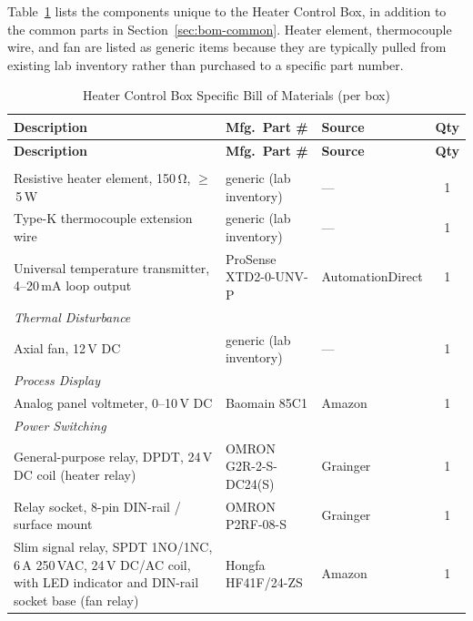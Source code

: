 \documentclass[main.tex]{subfiles}
\begin{document}
Table~\ref{tab:bom-heater} lists the components unique to the Heater Control Box, in addition to the common parts in Section~\ref{sec:bom-common}. Heater element, thermocouple wire, and fan are listed as generic items because they are typically pulled from existing lab inventory rather than purchased to a specific part number.

\renewcommand{\arraystretch}{1.3}
\begin{longtable}{p{6.5cm} l l c}
\caption{Heater Control Box Specific Bill of Materials (per box)} \label{tab:bom-heater} \\
\hline
\textbf{Description} & \textbf{Mfg.\ Part \#} & \textbf{Source} & \textbf{Qty} \\
\hline
\endfirsthead
\hline
\textbf{Description} & \textbf{Mfg.\ Part \#} & \textbf{Source} & \textbf{Qty} \\
\hline
\endhead
\hline
\endfoot

\multicolumn{4}{l}{\textit{Heater and Sensing}} \\
\hline
Resistive heater element, 150\,\si{\ohm}, $\geq$\,5\,W & generic (lab inventory) & --- & 1 \\
Type-K thermocouple extension wire & generic (lab inventory) & --- & 1 \\
Universal temperature transmitter, 4--20\,mA loop output & ProSense XTD2-0-UNV-P & AutomationDirect & 1 \\
\hline

\multicolumn{4}{l}{\textit{Thermal Disturbance}} \\
\hline
Axial fan, 12\,V DC & generic (lab inventory) & --- & 1 \\
\hline

\multicolumn{4}{l}{\textit{Process Display}} \\
\hline
Analog panel voltmeter, 0--10\,V DC & Baomain 85C1 & Amazon & 1 \\
\hline

\multicolumn{4}{l}{\textit{Power Switching}} \\
\hline
General-purpose relay, DPDT, 24\,V DC coil (heater relay) & OMRON G2R-2-S-DC24(S) & Grainger & 1 \\
Relay socket, 8-pin DIN-rail / surface mount & OMRON P2RF-08-S & Grainger & 1 \\
Slim signal relay, SPDT 1NO/1NC, 6\,A 250\,VAC, 24\,V DC/AC coil, with LED indicator and DIN-rail socket base (fan relay) & Hongfa HF41F/24-ZS & Amazon & 1 \\

\end{longtable}
\renewcommand{\arraystretch}{1}
\end{document}
